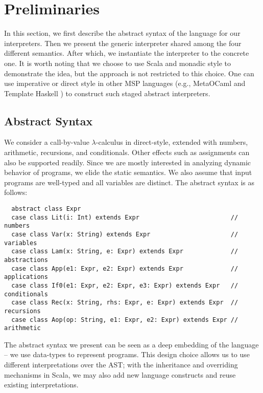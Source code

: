 \newcommand{\TLang}{$L_\lambda$}

\section{Preliminaries} \label{prelim}

In this section, we first describe the abstract syntax of the language for our interpreters. 
Then we present the generic interpreter shared among the four different
semantics. After which, we instantiate the interpreter to the concrete one.
It is worth noting that we choose to use Scala and monadic style to
demonstrate the idea, but the approach is not restricted to this
choice. One can use imperative or direct style in other MSP languages
(e.g., MetaOCaml \cite{DBLP:conf/gpce/CalcagnoTHL03, DBLP:conf/flops/Kiselyov14}
and Template Haskell \cite{Sheard:2002:TMH:636517.636528}) to construct
such staged abstract interpreters.

\subsection{Abstract Syntax} \label{bg_lang}

We consider a call-by-value $\lambda$-calculus in direct-style, extended
with numbers, arithmetic, recursions, and conditionals. Other effects
such as assignments can also be supported readily.
Since we are mostly interested in analyzing dynamic behavior of
programs, we elide the static semantics. We also assume that
input programs are well-typed and all variables are distinct. The abstract
syntax is as follows:
\begin{lstlisting}
  abstract class Expr
  case class Lit(i: Int) extends Expr                         // numbers
  case class Var(x: String) extends Expr                      // variables
  case class Lam(x: String, e: Expr) extends Expr             // abstractions
  case class App(e1: Expr, e2: Expr) extends Expr             // applications
  case class If0(e1: Expr, e2: Expr, e3: Expr) extends Expr   // conditionals
  case class Rec(x: String, rhs: Expr, e: Expr) extends Expr  // recursions
  case class Aop(op: String, e1: Expr, e2: Expr) extends Expr // arithmetic
\end{lstlisting}

The abstract syntax we present can be seen as a deep embedding of the
language -- we use data-types to represent programs. This design choice allows us
to use different interpretations over the AST; with the inheritance and
overriding mechanisms in Scala, we may also add new language constructs and reuse
existing interpretations.

